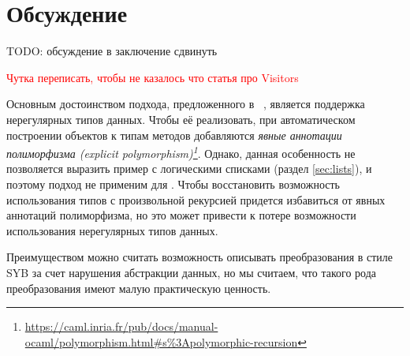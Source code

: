 \section{Обсуждение}
\label{sec:discussion}


TODO: обсуждение в заключение сдвинуть


\textcolor{red}{Чутка переписать, чтобы не казалось что статья про Visitors}

Основным достоинством подхода, предложенного в \visitors{}~\cite{Visitors}, является поддержка нерегулярных типов данных. Чтобы её реализовать, при автоматическом построении объектов к типам методов добавляются \emph{явные аннотации полиморфизма (explicit polymorphism)\footnote{\url{https://caml.inria.fr/pub/docs/manual-ocaml/polymorphism.html\#s\%3Apolymorphic-recursion}}}. Однако, данная особенность не позволяется выразить пример с логическими списками (раздел \ref{sec:lists}), и поэтому подход \visitors{} не применим для \OCanren{}.
Чтобы восстановить возможность использования типов с произвольной рекурсией  придется избавиться от явных аннотаций полиморфизма, но это может привести к потере возможности использования нерегулярных типов данных.

Преимуществом \visitors{} можно считать возможность описывать преобразования в стиле SYB\cite{SYB} за счет нарушения абстракции данных, но мы считаем, что такого рода преобразования имеют малую практическую ценность.


